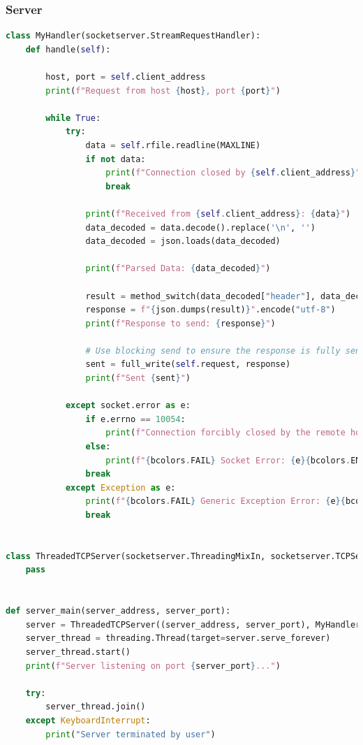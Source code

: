 \documentclass{article}
\begin{document}
\subsubsection{Server}
\begin{lstlisting}[language=python,firstnumber=1]
class MyHandler(socketserver.StreamRequestHandler):
    def handle(self):

        host, port = self.client_address
        print(f"Request from host {host}, port {port}")

        while True:
            try:
                data = self.rfile.readline(MAXLINE)
                if not data:
                    print(f"Connection closed by {self.client_address}")
                    break

                print(f"Received from {self.client_address}: {data}")
                data_decoded = data.decode().replace('\n', '')
                data_decoded = json.loads(data_decoded)

                print(f"Parsed Data: {data_decoded}")

                result = method_switch(data_decoded["header"], data_decoded["payload"])
                response = f"{json.dumps(result)}".encode("utf-8")
                print(f"Response to send: {response}")

                # Use blocking send to ensure the response is fully sent before closing
                sent = full_write(self.request, response)
                print(f"Sent {sent}")

            except socket.error as e:
                if e.errno == 10054:
                    print(f"Connection forcibly closed by the remote host {self.client_address}")
                else:
                    print(f"{bcolors.FAIL} Socket Error: {e}{bcolors.ENDC}")
                break
            except Exception as e:
                print(f"{bcolors.FAIL} Generic Exception Error: {e}{bcolors.ENDC}")
                break


class ThreadedTCPServer(socketserver.ThreadingMixIn, socketserver.TCPServer):
    pass


def server_main(server_address, server_port):
    server = ThreadedTCPServer((server_address, server_port), MyHandler)
    server_thread = threading.Thread(target=server.serve_forever)
    server_thread.start()
    print(f"Server listening on port {server_port}...")

    try:
        server_thread.join()
    except KeyboardInterrupt:
        print("Server terminated by user")
\end{lstlisting}
\end{document}
